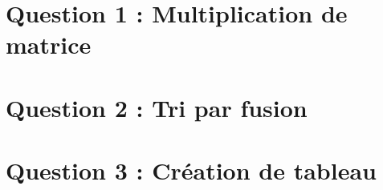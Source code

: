 \documentclass[a4paper, 11pt]{article} %
\begin{document}
\maketitle %


\section*{Question 1 : Multiplication de matrice}

\cleardoublepage

\section*{Question 2 : Tri par fusion}

\cleardoublepage

\section*{Question 3 : Création de tableau}

\cleardoublepage

\end{document}
